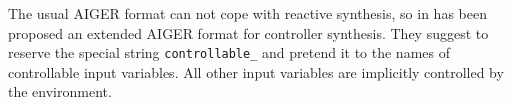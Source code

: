The usual AIGER format can not cope with reactive synthesis, so in \cite{jacobs2014extended} has been proposed an extended AIGER format for controller synthesis. They suggest to reserve the special string \lstinline{controllable_} and pretend it to the names of controllable input variables. 
All other input variables are implicitly controlled by the environment.
